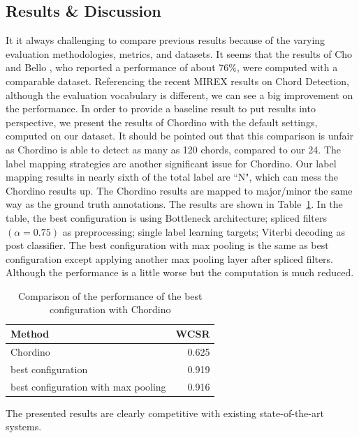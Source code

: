 \documentclass{article}
\begin{document}
\subsection{Results \& Discussion}
It it always challenging to compare previous results because of the varying evaluation methodologies, metrics, and datasets. It seems that the results of Cho and Bello \cite{cho2013mirex}, who reported a performance of about 76\%, were computed with a comparable dataset. Referencing the recent MIREX results on Chord Detection, although the  evaluation vocabulary is different, we can see a big improvement on the performance. In order to provide a baseline result to put results into perspective, we present the results of Chordino \cite{mauch2010approximate} with the default settings, computed on our dataset. It should be pointed out that this comparison is unfair as Chordino is able to detect as many as 120 chords, compared to our 24. The label mapping strategies are another significant issue for Chordino. Our label mapping results in nearly sixth of the total label are ``N", which can mess the Chordino results up. The Chordino results are mapped to major/minor the same way as the ground truth annotations. The results are shown in Table~\ref{tab: final}. In the table, the best configuration is using Bottleneck architecture; spliced filters $(\alpha = 0.75)$ as preprocessing; single label learning targets; Viterbi decoding as post classifier. The best configuration with max pooling is the same as best configuration except applying another max pooling layer after spliced filters. Although the performance is a little worse but the computation is much reduced. 
\begin{table}
\centering
\begin{tabular*}{\columnwidth}{@{\extracolsep{\fill}}lr}
\toprule
\textbf{Method}   &  \textbf{WCSR}   \\ \midrule
Chordino & 0.625       \\
best configuration &  0.919   \\ 
best configuration with max pooling & 0.916 \\ \bottomrule
\end{tabular*}
\caption{Comparison of the performance of the best configuration with Chordino}
\label{tab: final}
\end{table}
The presented results are clearly competitive with existing state-of-the-art systems.
\end{document}
